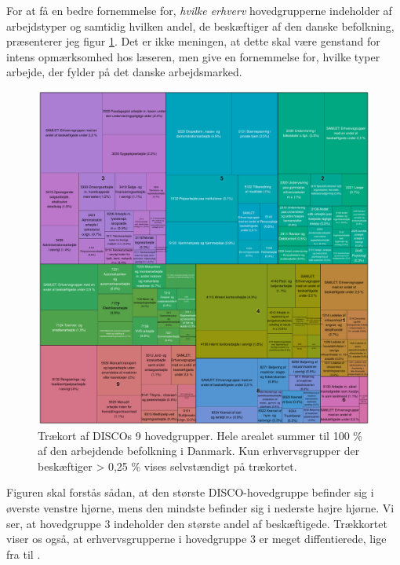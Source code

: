 For at få en bedre fornemmelse for, \emph{hvilke erhverv} hovedgrupperne indeholder af arbejdstyper og samtidig hvilken andel, de beskæftiger af den danske befolkning, præsenterer jeg figur \ref{figur treemap discohovedgrupper}. Det er ikke meningen, at dette skal være genstand for intens opmærksomhed hos læseren, men give en fornemmelse for, hvilke typer arbejde, der fylder på det danske arbejdsmarked. 

%
\begin{figure}[H]
\begin{center}
  \caption[Trækort af DISCOs hovedgrupper]{Trækort af DISCOs 9 hovedgrupper. Hele arealet summer til 100 \% af den arbejdende befolkning i Danmark. Kun erhvervsgrupper der beskæftiger > 0,25 \% vises selvstændigt på trækortet.}
  \label{figur treemap discohovedgrupper}
  \includegraphics[width=1.0\textwidth]{fig/treemaps/DISCO_hovedgrp_beskaeft.pdf}
\end{center}
\end{figure}
\restoregeometry
%

Figuren skal forstås sådan, at den største DISCO-hovedgruppe befinder sig i øverste venstre hjørne, mens den mindste befinder sig i nederste højre hjørne. Vi ser, at hovedgruppe 3 indeholder den største andel af beskæftigede. Trækkortet viser os også, at erhvervsgrupperne i hovedgruppe 3 er meget diffentierede, lige fra  til . 

